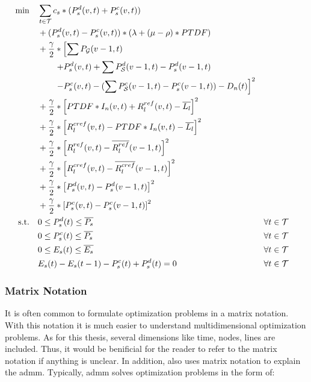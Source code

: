  \begin{subequations}
	\begin{align}
		 \min \quad & \sum_{t\in\mathcal{T}} c_s*(P_s^d(v, t) + P_s^c(v, t))\label{eq:sub:stor}\\
		 & + (P_s^d(v, t) - P_s^c(v, t)) * (\lambda + (\mu - \rho) * PTDF) \nonumber \\ 
		 & + \frac{\gamma}{2} * \left[\sum P_{\mathcal{G}}(v-1,t) \right. \nonumber \\ 
		 & \qquad \left. + P_s^d(v, t) + \sum P_{\mathcal{S}}^d(v-1, t) - P_s^d(v-1, t) \right. \nonumber \\
		 & \qquad \left. - P_s^c(v, t) - (\sum P_{\mathcal{S}}^c(v-1, t) -  P_s^c(v-1, t)) - D_n(t)\right]^2 \nonumber \\
		 & + \frac{\gamma}{2} * \left[PTDF * I_n(v, t) + R^{ref}_l(v, t) - \overline{L_l}\right]^2 \nonumber \\
		 & + \frac{\gamma}{2} * \left[R^{cref}_l(v, t) - PTDF * I_n(v, t) - \overline{L_l}\right]^2\nonumber \\
		 & + \frac{\gamma}{2} * \left[R^{ref}_l(v, t) - \overline{R^{ref}_l}(v-1, t)  \right]^2 \nonumber\\
		 & + \frac{\gamma}{2} * \left[R^{cref}_l(v, t) - \overline{R^{cref}_l}(v-1, t)  \right]^2 \nonumber \\
		 & + \frac{\gamma}{2} * \left[P_s^d(v, t) - P_s^d(v-1, t)\right]^2 \nonumber \\
		 & + \frac{\gamma}{2} * \left[P_s^c(v, t) - P_s^c(v-1, t)\right]^2 \nonumber \\
		 \text{s.t.} \quad & 0 \leq P_s^d(t) \leq \overline{P_s} && \forall t \in \mathcal{T} \\
		 & 0 \leq P_s^c(t) \leq \overline{P_s} && \forall t \in \mathcal{T}\\
		 & 0 \leq E_s(t) \leq \overline{E_s} && \forall t \in \mathcal{T}\\
		 & E_s(t) - E_s(t-1) - P_s^c(t) + P_s^d(t) = 0 && \forall t \in \mathcal{T}
	\end{align}
\end{subequations}

\subsubsection{Matrix Notation}

It is often common to formulate optimization problems in a matrix notation. With this notation it is much easier to understand multidimensional optimization problems. As for this thesis, several dimensions like time, nodes, lines are included. Thus, it would be benificial for the reader to refer to the matrix notation if anything is unclear. In addition, \citet{Boyd-2010-DistributedOptimizationStatistical} also uses matrix notation to explain the \gls{admm}. Typically, \gls{admm} solves optimization problems in the form of:

